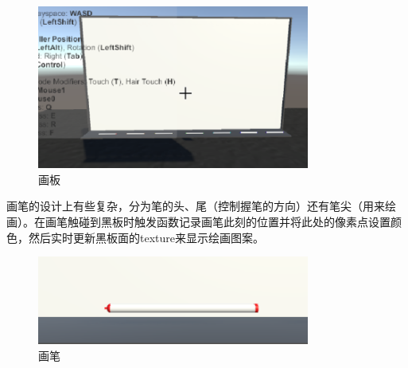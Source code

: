 \documentclass{article}
\begin{document}
\begin{figure}[htb]
    \centering
    \includegraphics[width=0.8\textwidth]{images/board.png}
    \caption{画板}\label{fig:digit}
\end{figure} 
    
画笔的设计上有些复杂，分为笔的头、尾（控制握笔的方向）还有笔尖（用来绘画）。在画笔触碰到黑板时触发函数记录画笔此刻的位置并将此处的像素点设置颜色，然后实时更新黑板面的texture来显示绘画图案。
    
\begin{figure}[htb]
    \centering
    \includegraphics[width=0.8\textwidth]{images/pen.png}
    \caption{画笔}\label{fig:digit}
\end{figure}
    
\end{document}
